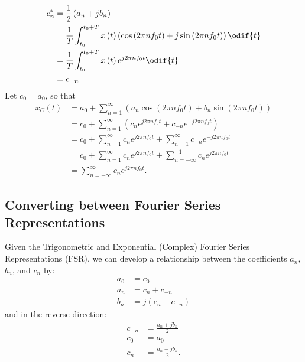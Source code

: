 \documentclass{article}
\begin{document}
\begin{align*}
    c_n^\ast & = \frac{1}{2} \left( a_n + j b_n \right)                                                                                                             \\
             & = \frac{1}{T} \int_{t_0}^{t_0 + T} x\left( t \right) \left( \cos{\left( 2\pi n f_0 t \right)} + j \sin{\left( 2\pi n f_0 t \right)} \right) \odif{t} \\
             & = \frac{1}{T} \int_{t_0}^{t_0 + T} x\left( t \right) e^{j 2\pi n f_0 t} \odif{t}                                                                     \\
             & = c_{-n}
\end{align*}
Let \(c_0 = a_0\), so that
\begin{align*}
    x_C\left( t \right) & = a_0 + \sum_{n = 1}^\infty \left( a_n \cos{\left( 2\pi n f_0 t \right)} + b_n \sin{\left( 2\pi n f_0 t \right)} \right) \\
                        & = c_0 + \sum_{n = 1}^\infty \left( c_n e^{j 2\pi n f_0 t} + c_{-n} e^{-j 2\pi n f_0 t} \right)                           \\
                        & = c_0 + \sum_{n = 1}^\infty c_n e^{j 2\pi n f_0 t} + \sum_{n = 1}^\infty c_{-n} e^{-j 2\pi n f_0 t}                      \\
                        & = c_0 + \sum_{n = 1}^\infty c_n e^{j 2\pi n f_0 t} + \sum_{n = -\infty}^{-1} c_{n} e^{j 2\pi n f_0 t}                    \\
                        & = \sum_{n = -\infty}^\infty c_n e^{j 2\pi n f_0 t}.
\end{align*}
\subsection{Converting between Fourier Series Representations}
Given the Trigonometric and Exponential (Complex) Fourier Series
Representations (FSR), we can develop a relationship between the
coefficients \(a_n\), \(b_n\), and \(c_n\) by:
\begin{align*}
    a_0 & = c_0                           \\
    a_n & = c_n + c_{-n}                  \\
    b_n & = j \left( c_n - c_{-n} \right)
\end{align*}
and in the reverse direction:
\begin{align*}
    c_{-n} & = \frac{a_n + j b_n}{2}  \\
    c_0    & = a_0                    \\
    c_n    & = \frac{a_n - j b_n}{2}.
\end{align*}
\end{document}
